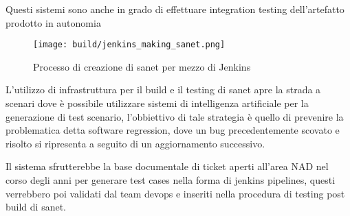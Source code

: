 Questi sistemi sono anche in grado di effettuare integration testing dell'artefatto prodotto in autonomia

\begin{figure}[H]
    \centering
    \texttt{[image: build/jenkins\_making\_sanet.png]}
    \caption{Processo di creazione di sanet per mezzo di Jenkins}
    \label{fig:jenkins_making_sanet}
\end{figure}

L'utilizzo di infrastruttura per il build e il testing di sanet apre la strada a scenari dove è possibile utilizzare sistemi di intelligenza artificiale per la generazione di test scenario, l'obbiettivo di tale strategia è quello di prevenire la problematica detta software regression, dove un bug precedentemente scovato e risolto si ripresenta a seguito di un aggiornamento successivo.

Il sistema sfrutterebbe la base documentale di ticket aperti all'area NAD nel corso degli anni per generare test cases nella forma di jenkins pipelines, questi verrebbero poi validati dal team devops e inseriti nella procedura di testing post build di sanet.
